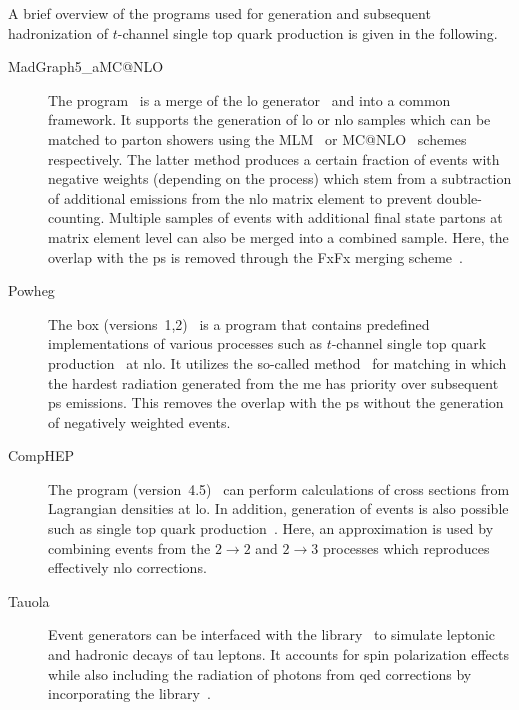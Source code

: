 A brief overview of the programs used for generation and subsequent hadronization of $t$-channel single top quark production is given in the following.

\begin{description}
\item[MadGraph5\_aMC{@}NLO] The \MGAMC[] program~\cite{Alwall:2014hca} is a merge of the \gls{lo} \MG[] generator~\cite{Alwall:2011uj} and \AMC[] into a common framework. It supports the generation of \gls{lo} or \gls{nlo} samples which can be matched to parton showers using the MLM~\cite{Mangano:2006rw} or MC{@}NLO~\cite{Frixione:2002ik} schemes respectively. The latter method produces a certain fraction of events with negative weights (depending on the process) which stem from a subtraction of additional emissions from the \gls{nlo} matrix element to prevent double-counting. 
Multiple samples of events with additional final state partons at matrix element level can also be merged into a combined sample. Here, the overlap with the \gls{ps} is removed through the FxFx merging scheme~\cite{Frederix:2012ps}.

\item[Powheg] The \POWHEG[] box (versions~1,2)~\cite{Alioli:2010xd} is a program that contains predefined implementations of various processes such as $t$-channel single top quark production~\cite{Alioli:2009je} at \gls{nlo}. It utilizes the so-called \POWHEG method~\cite{Frixione:2007vw} for matching in which the hardest radiation generated from the \gls{me} has priority over subsequent \gls{ps} emissions. This removes the overlap with the \gls{ps} without the generation of negatively weighted events.

\item[CompHEP] The \COMPHEP[] program (version~4.5)~\cite{Boos:2004kh} can perform calculations of cross sections from Lagrangian densities at \gls{lo}. In addition, generation of events is also possible such as single top quark production~\cite{Boos:2006af}. Here, an approximation is used by combining events from the $2\to2$ and $2\to3$ processes which reproduces effectively \gls{nlo} corrections.

\item[Tauola] Event generators can be interfaced with the \TAUOLA[] library~\cite{Jadach:1993hs,Davidson:2010rw} to simulate leptonic and hadronic decays of tau leptons. It accounts for spin polarization effects while also including the radiation of photons from \gls{qed} corrections by incorporating the \PHOTOS[] library~\cite{Golonka:2005pn}.


\end{description}
